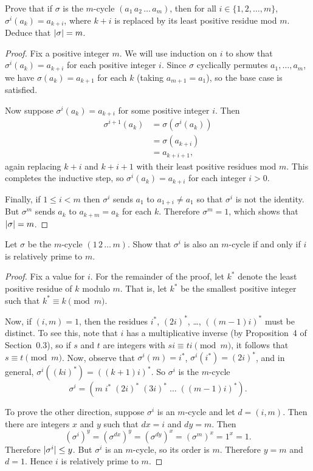  Prove that if $\sigma$ is the $m$-cycle
$(a_1\,a_2\,\dots\,a_m)$, then for all $i\in\{1,2,\dots,m\}$,
$\sigma^i(a_k) = a_{k+i}$, where $k+i$ is replaced by its least
positive residue mod $m$. Deduce that $\lvert{\sigma}\rvert = m$.
\begin{proof}
  Fix a positive integer $m$. We will use induction on $i$ to show
  that $\sigma^i(a_k) = a_{k+i}$ for each positive integer $i$. Since
  $\sigma$ cyclically permutes $a_1,\dots,a_m$, we have
  $\sigma(a_k) = a_{k+1}$ for each $k$ (taking $a_{m+1} = a_1$), so
  the base case is satisfied.

  Now suppose $\sigma^i(a_k) = a_{k+i}$ for some positive integer
  $i$. Then
  \begin{align*}
    \sigma^{i+1}(a_k) &= \sigma(\sigma^i(a_k)) \\
                      &= \sigma(a_{k+i}) \\
                      &= a_{k+i+1},
  \end{align*}
  again replacing $k+i$ and $k+i+1$ with their least positive residues
  mod $m$. This completes the inductive step, so
  $\sigma^i(a_k) = a_{k+i}$ for each integer $i > 0$.

  Finally, if $1\leq i<m$ then $\sigma^i$ sends $a_1$ to
  $a_{1+i}\neq a_1$ so that $\sigma^i$ is not the identity. But
  $\sigma^m$ sends $a_k$ to $a_{k+m} = a_k$ for each $k$. Therefore
  $\sigma^m = 1$, which shows that $\lvert{\sigma}\rvert = m$.
\end{proof}

 Let $\sigma$ be the $m$-cycle $(1\,2\,\dots\,m)$. Show
that $\sigma^i$ is also an $m$-cycle if and only if $i$ is relatively
prime to $m$.
\label{exercise-m-cycle-power}
\begin{proof}
  Fix a value for $i$. For the remainder of the proof, let $k^*$
  denote the least positive residue of $k$ modulo $m$. That is, let
  $k^*$ be the smallest positive integer such that
  $k^*\equiv k\pmod m$.

  Now, if $(i,m) = 1$, then the residues $i^*$, $(2i)^*$, \dots,
  $((m-1)i)^*$ must be distinct. To see this, note that $i$ has a
  multiplicative inverse (by Proposition~4 of Section~0.3), so if $s$
  and $t$ are integers with $si\equiv ti\pmod m$, it follows that
  $s\equiv t\pmod m$. Now, observe that $\sigma^i(m) = i^*$,
  $\sigma^i(i^*) = (2i)^*$, and in general,
  $\sigma^i((ki)^*) = ((k+1)i)^*$. So $\sigma^i$ is the $m$-cycle
  \begin{equation*}
    \sigma^i = (m\;i^*\;(2i)^*\;(3i)^*\;\dots\;((m-1)i)^*).
  \end{equation*}

  To prove the other direction, suppose $\sigma^i$ is an $m$-cycle and
  let $d = (i, m)$. Then there are integers $x$ and $y$ such that
  $dx = i$ and $dy = m$. Then
  \begin{equation*}
    (\sigma^i)^y = (\sigma^{dx})^y
    = (\sigma^{dy})^x = (\sigma^m)^x = 1^x = 1.
  \end{equation*}
  Therefore $\lvert{\sigma^i}\rvert \leq y$. But $\sigma^i$ is an $m$-cycle,
  so its order is $m$. Therefore $y = m$ and $d = 1$. Hence $i$ is
  relatively prime to $m$.
\end{proof}

